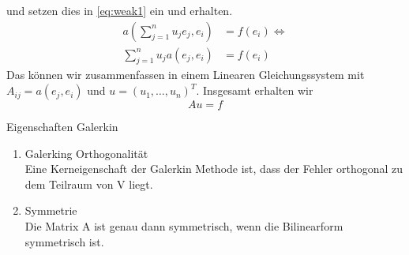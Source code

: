 und setzen dies in \ref{eq:weak1} ein und erhalten.
\begin{equation}
\begin{aligned}
a( \sum_{j=1}^{n} u_j e_j, e_i ) &= f(e_i) \Longleftrightarrow \\
\sum_{j=1}^{n} u_j a( e_j, e_i ) &= f(e_i)
\end{aligned}
\end{equation}
Das können wir zusammenfassen in einem Linearen Gleichungssystem mit $A_{ij}=a(e_j,e_i)$ und $u=(u_1,\dots,u_n)^{T}$. Insgesamt erhalten wir
\begin{equation}
Au=f
\end{equation}

\begin{Bemerkung} Eigenschaften Galerkin \\
\begin{enumerate} 
\item Galerking Orthogonalität \\
Eine Kerneigenschaft der Galerkin Methode ist, dass der Fehler orthogonal zu dem Teilraum von V liegt.
\item Symmetrie \\
Die Matrix A ist genau dann symmetrisch, wenn die Bilinearform symmetrisch ist.
\end{enumerate}
\end{Bemerkung}


